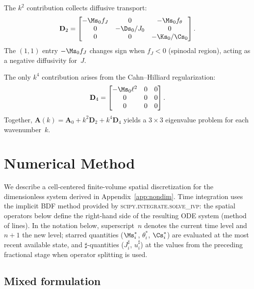 The $k^2$ contribution collects diffusive transport:
\begin{equation}
  \mathbf D_2 =
  \begin{bmatrix}
    -\Ms_0 f_J & 0 & -\Ms_0 f_\theta \\
    0 & -\Ds_0/J_0 & 0 \\
    0 & 0 & -\Ks_0/\Cs_0
  \end{bmatrix}.
  \label{eq:D2}
\end{equation}
The $(1,1)$ entry $-\Ms_0 f_J$ changes sign when $f_J<0$ (spinodal
region), acting as a negative diffusivity for~$J$.

The only $k^4$ contribution arises from the Cahn--Hilliard
regularization:
\begin{equation}
  \mathbf D_4 =
  \begin{bmatrix}
    -\Ms_0\ell^2 & 0 & 0 \\
    0 & 0 & 0 \\
    0 & 0 & 0
  \end{bmatrix}.
  \label{eq:D4}
\end{equation}
Together, $\mathbf A(k) = \mathbf A_0 + k^2\mathbf D_2 +
k^4\mathbf D_4$ yields a $3\times 3$ eigenvalue problem for each
wavenumber~$k$.


\section{Numerical Method}
\label{app:numerics}

We describe a cell-centered finite-volume spatial discretization for the
dimensionless system derived in Appendix~\ref{app:nondim}.  Time
integration uses the implicit BDF method provided by
\textsc{scipy.integrate.solve\_ivp}: the spatial operators below
define the right-hand side of the resulting ODE system (method of
lines).  In the notation below, superscript~$n$ denotes the current
time level and~$n\!+\!1$ the new level; starred quantities
($\Ms_i^*$, $\theta_i^*$, $\Cs_i^*$) are evaluated at the most
recent available state, and $\sharp$-quantities ($J_i^\sharp$,
$u_i^\sharp$) at the values from the preceding fractional stage when
operator splitting is used.

\subsection{Mixed formulation}

